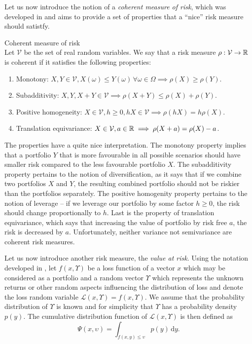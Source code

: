 Let us now introduce the notion of a \textit{coherent measure of risk}, which was developed in \cite[Defintion 2.4.]{coherent_measures_of_risk} and aims to provide a set of properties that a “nice” risk measure should satistfy.
\begin{defn}{Coherent measure of risk} \\
Let $\mathcal{V}$ be the set of real random variables. We say that a risk measure $\rho: \mathcal{V} \rightarrow \mathbb{R}$ is coherent if it satisfies the following properties:
\begin{enumerate}
	\item Monotony: $X, Y \in \mathcal{V}, X(\omega) \leq Y(\omega) \, \forall \omega \in \Omega \implies \rho(X) \geq \rho(Y)$.
	\item Subadditivity: $X, Y, X+Y \in \mathcal{V} \implies \rho(X+	Y) \leq \rho(X) + \rho(Y)$.
	\item Positive homogeneity: $X \in \mathcal{V}, h \geq 0, hX \in \mathcal{V} \implies \rho(hX)=h\rho(X)$.
	\item Translation equivariance: $X \in \mathcal{V}, a \in \mathbb{R} \implies \rho(X+a)=\rho(X)-a$.
\end{enumerate}
\end{defn}
The properties have a quite nice interpretation. The monotony property implies that a portfolio $Y$ that is more favourable in all possible scenarios should have smaller risk compared to the less favourable portfolio $X$. The subadditivity property pertains to the notion of diversification, as it says that if we combine two portfolios $X$ and $Y$, the resulting combined portfolio should not be riskier than the portfolios separately. The positive homogenity property pertains to the notion of leverage -- if we leverage our portfolio by some factor $h\geq0$, the risk should change proportionally to $h$. Last is the property of translation equivariance, which says that increasing the value of portfolio by risk free $a$, the risk is decreased by $a$.  Unfortunately, neither variance not semivariance are coherent risk measures.

Let us now introduce another risk measure, the \textit{value at risk}.
Using the notation developed in \cite{cornuejols_tutuncu_2006}, let $f(x,\Upsilon)$ be a loss function of a vector $x$ which may be considered as a portfolio and a random vector $\Upsilon$ which represents the unknown returns or other random aspects influencing the distribution of loss and denote the loss random variable $\mathcal{L}(x,\Upsilon)=f(x,\Upsilon)$. We assume that the probability distribution of $\Upsilon$ is known and for simplicity that $\Upsilon$ has a probability density $p(y)$. The cumulative distribution function of $\mathcal{L}(x,\Upsilon)$ is then defined as
\begin{equation*}
\Psi(x,\upsilon)=\int_{f(x,y) \leq \upsilon} p(y) \, \mathrm{d}y.
\end{equation*}

